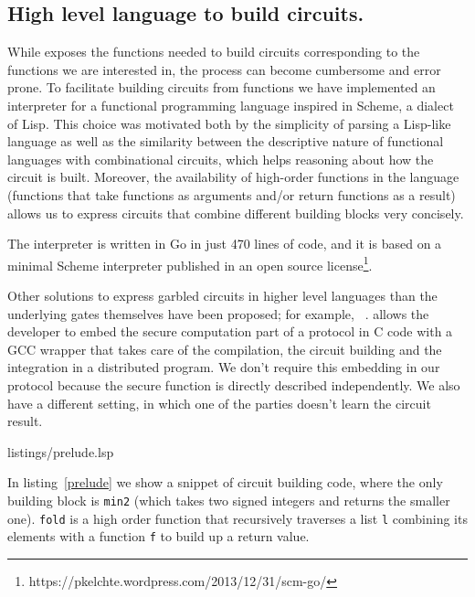 \subsection{High level language to build circuits.}

While \libgarble{} exposes the functions needed to build circuits corresponding
to the functions we are interested in, the process can become cumbersome and error
prone.  To facilitate building circuits from functions we have implemented an
interpreter for a functional programming language inspired in Scheme, a dialect
of Lisp.  This choice was motivated both by the simplicity of parsing a
Lisp-like language as well as the similarity between the descriptive nature of
functional languages with combinational circuits, which helps reasoning about
how the circuit is built.  Moreover, the availability of high-order functions
in the language (functions that take functions as arguments and/or return
functions as a result) allows us to express circuits that combine different
building blocks very concisely.

The interpreter is written in Go in just 470 lines of code, and it is based on
a minimal Scheme interpreter published in an open source
license\footnote{https://pkelchte.wordpress.com/2013/12/31/scm-go/}.

Other solutions to express garbled circuits in higher level languages than the
underlying gates themselves have been proposed; for example, \OblivC{}~\cite{oblivc}.
\OblivC{} allows the developer to embed the secure computation part of a
protocol in C code with a GCC wrapper that takes care of the compilation, the
circuit building and the integration in a distributed program.  We don't
require this embedding in our protocol because the secure function is directly
described independently.  We also have a different setting, in which one of the
parties doesn't learn the circuit result.

\noindent
\begin{minipage}{\linewidth}

{listings/prelude.lsp}
\end{minipage}

In listing~\ref{prelude} we show a snippet of circuit building code, where the
only \libgarble{} building block is \texttt{min2} (which takes two signed
integers and returns the smaller one).  \texttt{fold} is a high order function
that recursively traverses a list \texttt{l} combining its elements with a
function \texttt{f} to build up a return value.

